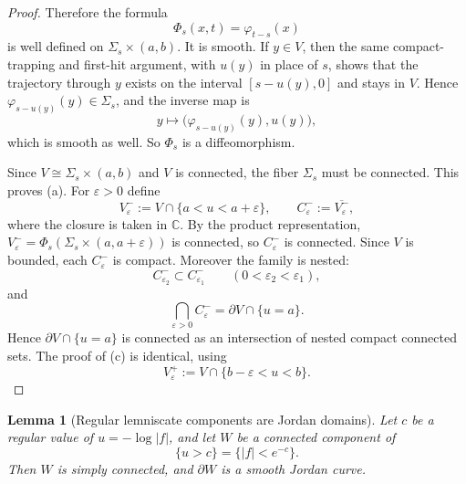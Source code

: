 \documentclass[12pt]{amsart}
\theoremstyle{definition}
\newtheorem{lemma}[theorem]{Lemma}
\theoremstyle{remark}
\begin{document}
\begin{proof}
\indent Therefore the formula
\[
\Phi_s(x,t)=\varphi_{t-s}(x)
\]
is well defined on $\Sigma_s\times(a,b)$. It is smooth. If $y\in V$, then the same compact-trapping and first-hit
argument, with $u(y)$ in place of $s$, shows that the trajectory through $y$ exists on the interval
$[s-u(y),0]$ and stays in $V$. Hence $\varphi_{s-u(y)}(y)\in\Sigma_s$, and the inverse map is
\[
 y\mapsto \bigl(\varphi_{s-u(y)}(y),u(y)\bigr),
\]
which is smooth as well. So $\Phi_s$ is a diffeomorphism.

\indent Since $V\cong \Sigma_s\times(a,b)$ and $V$ is connected, the fiber $\Sigma_s$ must be connected. This proves (a). For
$\varepsilon>0$ define
\[
V_\varepsilon^-:=V\cap\{a<u<a+\varepsilon\},\qquad C_\varepsilon^-:=\overline{V_\varepsilon^-},
\]
where the closure is taken in $\mathbb{C}$. By the product representation, $V_\varepsilon^-=\Phi_s(\Sigma_s\times(a,a+\varepsilon))$ is connected,
so $C_\varepsilon^-$ is connected. Since $V$ is bounded, each $C_\varepsilon^-$ is compact. Moreover the family is nested:
\[
 C_{\varepsilon_2}^-\subset C_{\varepsilon_1}^-\qquad (0<\varepsilon_2<\varepsilon_1),
\]
and
\[
 \bigcap_{\varepsilon>0} C_\varepsilon^-=\partial V\cap\{u=a\}.
\]
Hence $\partial V\cap\{u=a\}$ is connected as an intersection of nested compact connected sets. The proof of
(c) is identical, using
\[
V_\varepsilon^+:=V\cap\{b-\varepsilon<u<b\}.
\]
\end{proof}

\medskip
\begin{lemma}[Regular lemniscate components are Jordan domains]\label{lem:jordan-domain}
\emph{Let $c$ be a regular value of
$u=-\log|f|$, and let $W$ be a connected component of
\[
\{u>c\}=\{|f|<e^{-c}\}.
\]
Then $W$ is simply connected, and $\partial W$ is a smooth Jordan curve.}
\end{lemma}
\end{document}
